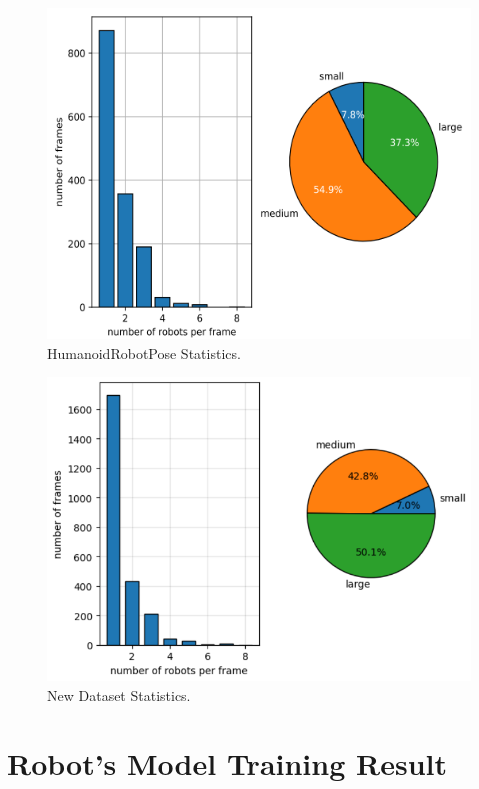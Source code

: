 \begin{figure}[ht]
  \centering
  \includegraphics[scale=0.78]{gambar/old_dataset.png}
  \caption{HumanoidRobotPose Statistics.}
  \label{fig:nimbro-statistics}
\end{figure}

\begin{figure}[ht]
  \centering
  \includegraphics[scale=0.63]{gambar/new_dataset.png}
  \caption{New Dataset Statistics.}
  \label{fig:new-dataset-statistics}
\end{figure}


\section{Robot's Model Training Result}
\label{sec:robotmodeltrainingresult}

